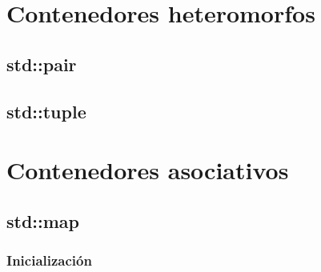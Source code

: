 \documentclass[12pt, fleqn]{report}                             %
\theoremstyle{break}                                            %
\begin{document}
    \clearpage
    \chapter{Contenedores heteromorfos}

        \clearpage
        \section{std::pair}

        \clearpage
        \section{std::tuple}


    \clearpage
    \chapter{Contenedores asociativos}
        
        \clearpage
        \section{std::map}

            \subsection{Inicialización}
\end{document}
